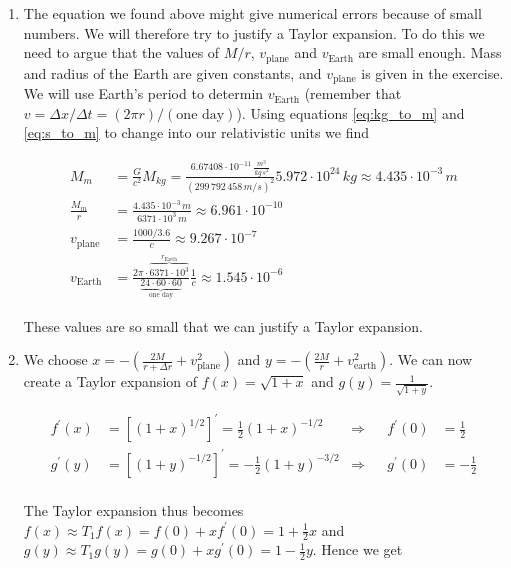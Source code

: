 \documentclass[a4paper,10pt,english]{article}
\begin{document}
\begin{enumerate}
\item The equation we found above might give numerical errors because of small numbers. We will therefore try to justify a Taylor expansion. To do this we need to argue that the values of $M/r$, $v_{\text{plane}}$ and $v_{\text{Earth}}$ are small enough. Mass and radius of the Earth are given constants, and $v_{\text{plane}}$ is given in the exercise. We will use Earth's period to determin $v_{\text{Earth}}$ (remember that $v=\Delta x/\Delta t=(2\pi r)/(\text{one day})$). Using equations \ref{eq:kg_to_m} and \ref{eq:s_to_m} to change into our relativistic units we find

\begin{align*}
M_{m}&=\frac{G}{c^{2}}M_{kg}=\frac{6.67408\cdot10^{-11}\,\frac{m^{3}}{kg\,s^{2}}}{(299\,792\,458\,m/s)^{2}}5.972\cdot10^{24}\,kg\approx4.435\cdot10^{-3}\,m\\
\frac{M_{m}}{r}&=\frac{4.435\cdot10^{-3}\,m}{6371\cdot10^{3}\,m}\approx6.961\cdot10^{-10}\\
v_{\text{plane}}&=\frac{1000/3.6}{c}\approx9.267\cdot10^{-7}\\
v_{\text{Earth}}&=\frac{2\pi\cdot\overbrace{6371\cdot10^{3}}^{r_{\text{Earth}}}}{\underbrace{24\cdot60\cdot60}_{\text{one day}}}\frac{1}{c}\approx1.545\cdot10^{-6}
\end{align*}

These values are so small that we can justify a Taylor expansion.

\item We choose $x=-\left(\frac{2M}{r+\Delta r}+v_{\text{plane}}^{2}\right)$ and $y=-\left(\frac{2M}{r}+v_{\text{earth}}^{2}\right)$. We can now create a Taylor expansion of $f(x)=\sqrt{1+x}$ and $g(y)=\frac{1}{\sqrt{1+y}}$.

\begin{align*}
f^{\prime}(x)&=\left[(1+x)^{1/2}\right]^{\prime}=\frac{1}{2}(1+x)^{-1/2} &\Rightarrow&& f^{\prime}(0)&=\frac{1}{2}\\
g^{\prime}(y)&=\left[(1+y)^{-1/2}\right]^{\prime}=-\frac{1}{2}(1+y)^{-3/2} &\Rightarrow&& g^{\prime}(0)&=-\frac{1}{2}\\
\end{align*}

The Taylor expansion thus becomes $f(x)\approx T_{1}f(x)=f(0)+xf^{\prime}(0)=1+\frac{1}{2}x$ and $g(y)\approx T_{1}g(y)=g(0)+xg^{\prime}(0)=1-\frac{1}{2}y$. Hence we get


\end{enumerate}
\end{document}
